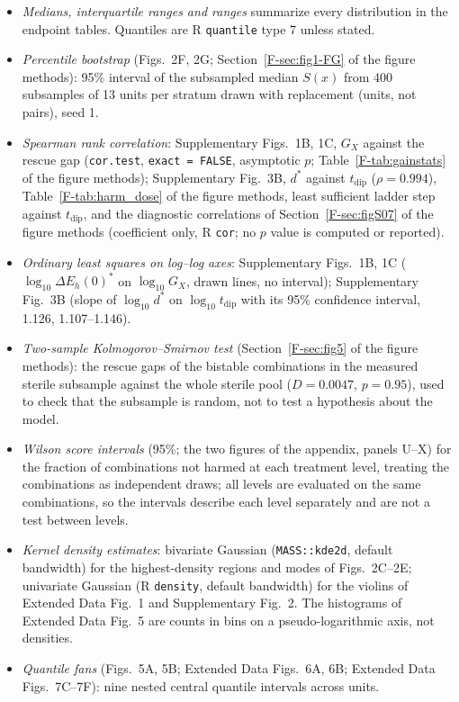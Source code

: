 \documentclass[11pt]{article}
\newcommand{\gap}{\Delta E_h(0)^{*}}
\begin{document}
\begin{itemize}
\item \emph{Medians, interquartile ranges and ranges} summarize every distribution in
  the endpoint tables. Quantiles are R \texttt{quantile} type 7 unless stated.
\item \emph{Percentile bootstrap} (Figs.~2F, 2G; Section~\ref{F-sec:fig1-FG} of the figure methods): 95\%
  interval of the subsampled median $S(x)$ from 400 subsamples of 13 units per stratum
  drawn with replacement (units, not pairs), seed 1.
\item \emph{Spearman rank correlation}: Supplementary Figs.~1B, 1C, $G_X$ against the rescue gap
  (\texttt{cor.test}, \texttt{exact = FALSE}, asymptotic $p$; Table~\ref{F-tab:gainstats} of the figure methods);
  Supplementary Fig.~3B, $d^\ast$ against $t_{\mathrm{dip}}$ ($\rho = 0.994$),
  Table~\ref{F-tab:harm_dose} of the figure methods, least sufficient ladder step against $t_{\mathrm{dip}}$,
  and the diagnostic correlations of Section~\ref{F-sec:figS07} of the figure methods (coefficient only,
  R \texttt{cor}; no $p$ value is computed or reported).
\item \emph{Ordinary least squares on log--log axes}: Supplementary Figs.~1B, 1C
  ($\log_{10}\gap$ on $\log_{10} G_X$, drawn lines, no interval); Supplementary Fig.~3B (slope of $\log_{10} d^\ast$ on $\log_{10} t_{\mathrm{dip}}$ with its 95\%
  confidence interval, 1.126, 1.107--1.146).
\item \emph{Two-sample Kolmogorov--Smirnov test} (Section~\ref{F-sec:fig5} of the figure methods): the rescue
  gaps of the bistable combinations in the measured sterile subsample against the whole
  sterile pool ($D = 0.0047$, $p = 0.95$), used to check that the subsample is random,
  not to test a hypothesis about the model.
\item \emph{Wilson score intervals} (95\%; the two figures of the appendix, panels U--X)
  for the fraction of combinations not harmed at each treatment level, treating the
  combinations as independent draws; all levels are evaluated on the same combinations,
  so the intervals describe each level separately and are not a test between levels.
\item \emph{Kernel density estimates}: bivariate Gaussian (\texttt{MASS::kde2d}, default
  bandwidth) for the highest-density regions and modes of Figs.~2C--2E; univariate
  Gaussian (R \texttt{density}, default bandwidth) for the violins of Extended Data Fig.~1
and Supplementary Fig.~2. The histograms of Extended Data Fig.~5 are counts in
  bins on a pseudo-logarithmic axis, not densities.
\item \emph{Quantile fans} (Figs.~5A, 5B; Extended Data Figs.~6A, 6B; Extended Data Figs.~7C--7F): nine nested
  central quantile intervals across units.
\end{itemize}
\end{document}
